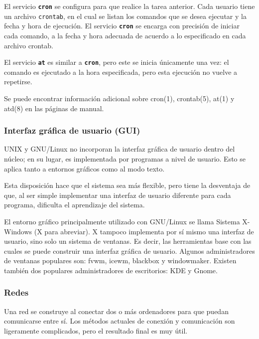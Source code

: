  El servicio \texttt{\textbf{cron}} se configura para que realice la
tarea anterior. Cada usuario tiene un archivo \texttt{crontab}, en
el cual se listan los comandos que se desea ejecutar y la fecha y hora de
ejecución. El servicio \texttt{\textbf{cron}} se encarga con precisión de
iniciar cada comando, a la fecha y hora adecuada de acuerdo a lo especificado en
cada archivo crontab.  

 El servicio \texttt{\textbf{at}} es similar a \texttt{\textbf{cron}},
pero este se inicia únicamente una vez: el comando es ejecutado a la hora
especificada, pero esta ejecución no vuelve a repetirse.  

 Se puede encontrar información adicional sobre cron(1), crontab(5), at(1)
y atd(8) en las páginas de manual.  



\subsubsection{ Interfaz gráfica de usuario (GUI)}

 UNIX y GNU/Linux no incorporan la interfaz gráfica de usuario dentro del
núcleo; en su lugar, es implementada por programas a nivel de usuario. Esto se
aplica tanto a entornos gráficos como al modo texto.  

 Esta disposición hace que el sistema sea más flexible, pero tiene la
desventaja de que, al ser simple implementar una interfaz de usuario diferente
para cada programa, dificulta el aprendizaje del sistema.  

 El entorno gráfico principalmente utilizado con GNU/Linux se llama
Sistema X-Windows (X para abreviar). X tampoco implementa por sí mismo una
interfaz de usuario, sino solo un sistema de ventanas. Es decir, las
herramientas base con las cuales se puede construir una interfaz gráfica de
usuario. Algunos administradores de ventanas populares son: fvwm, icewm,
blackbox y windowmaker. Existen también dos populares administradores de
escritorios: KDE y Gnome.  




\subsubsection{ Redes}

 Una red se construye al conectar dos o más ordenadores para que puedan
comunicarse entre sí. Los métodos actuales de conexión y comunicación son
ligeramente complicados, pero el resultado final es muy útil.  


